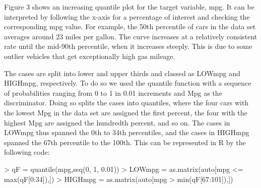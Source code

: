 \documentclass{homework}
\begin{document}
Figure 3 shows an increasing quantile plot for the target variable, mpg. It can be interpreted by following the x-axis for a percentage of interest and checking the corresponding mpg value. For example, the 50th percentile of cars in the data set averages around 23 miles per gallon. The curve increases at a relatively consistent rate until the mid-90th percentile, when it increases steeply. This is due to some outlier vehicles that get exceptionally high gas mileage.

\question
The cases are split into lower and upper thirds and classed as LOWmpg and HIGHmpg, respectively. To do so we used the quantile function with a sequence of probabilities ranging from 0 to 1 in 0.01 increments and Mpg as the discriminator. Doing so splits the cases into quantiles, where the four cars with the lowest Mpg in the data set are assigned the first percent, the four with the highest Mpg are assigned the hundredth percent, and so on. The cases in LOWmpg thus spanned the 0th to 34th percentiles, and the cases in HIGHmpg spanned the 67th percentile to the 100th. This can be represented in R by the following code:
\begin{rc}
> qF = quantile(mpg,seq(0, 1, 0.01))
> LOWmpg = as.matrix(auto[mpg <= max(qF[0:34]),])
> HIGHmpg = as.matrix(auto[mpg > min(qF[67:101]),])
\end{rc}
\end{document}
